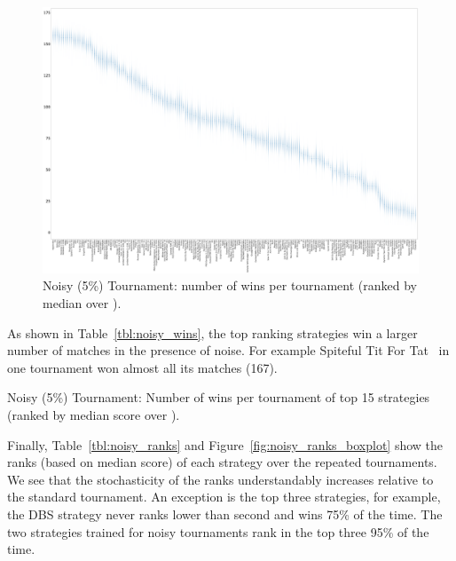 \documentclass{article}
\begin{document}
\begin{landscape}
    \begin{figure}[!hbtp]
        \centering
        \includegraphics[width=\paperwidth]{./assets/noisy_wins_boxplots.pdf}
        \caption{Noisy (5\%) Tournament: number of wins per tournament (ranked by
        median over
        \protecttournaments).}
        \label{fig:noisy_winplot}
    \end{figure}
\end{landscape}

As shown in Table~\ref{tbl:noisy_wins}, the top ranking strategies win a larger
number of matches in the presence of noise. For example Spiteful Tit For Tat~\cite{Prison1998} 
in one tournament won almost all its matches (167).

\begin{table}[!hbtp]
    \centering
        
        \caption{Noisy (5\%) Tournament: Number of wins per tournament
        of top 15 strategies (ranked by median score over
        \protecttournaments).}
        \label{tbl:noisy_wins}
\end{table}


Finally, Table~\ref{tbl:noisy_ranks} and
Figure~\ref{fig:noisy_ranks_boxplot} show the ranks (based on median score)
of each strategy over the repeated tournaments. We see that the stochasticity
of the ranks understandably increases relative to the standard tournament. An
exception is the top three strategies, for example, the DBS strategy never ranks
lower than
second and wins 75\% of the time. The two strategies trained for noisy
tournaments rank in the top three 95\% of the time.
\end{document}
